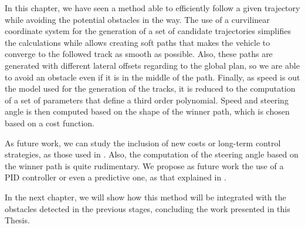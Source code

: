 In this chapter, we have seen a method able to efficiently follow a given trajectory while avoiding the potential obstacles in the way. The use of a curvilinear coordinate system for the generation of a set of candidate trajectories simplifies the calculations while allows creating soft paths that makes the vehicle to converge to the followed track as smooth as possible. Also, these paths are generated with different lateral offsets regarding to the global plan, so we are able to avoid an obstacle even if it is in the middle of the path. Finally, as speed is out the model used for the generation of the tracks, it is reduced to the computation of a set of parameters that define a third order polynomial. Speed and steering angle is then computed based on the shape of the winner path, which is chosen based on a cost function.

As future work, we can study the inclusion of new costs or long-term control strategies, as those used in \cite{werling2010optimal}. Also, the computation of the steering angle based on the winner path is quite rudimentary. We propose as future work the use of a PID controller or even a predictive one, as that explained in .

In the next chapter, we will show how this method will be integrated with the obstacles detected in the previous stages, concluding the work presented in this Thesis.


